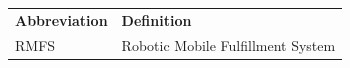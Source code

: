 %
%
%

\begin{center}
\begin{tabular}{@{}p{3.5cm}p{10cm}@{}}
\textbf{Abbreviation} & \textbf{Definition} \\[4pt]
RMFS & Robotic Mobile Fulfillment System \\
\end{tabular}
\end{center}
